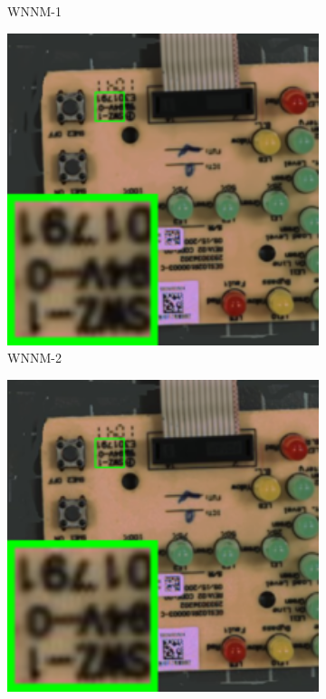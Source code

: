 \begin{figure}
\begin{subfigure}[t]{0.19\textwidth}
		\caption{WNNM-1}
    \end{subfigure}
    \hfill
    \begin{subfigure}[t]{0.19\textwidth}
        \centering
        \includegraphics[width=1\textwidth]{images/mcwnnm/nc/resize_br_WNNMJ_circuit.png}
		\caption{WNNM-2}
    \end{subfigure}
    \hfill
    \begin{subfigure}[t]{0.19\textwidth}
        \centering
        \includegraphics[width=1\textwidth]{images/mcwnnm/nc/resize_br_WNNM_ADMM_circuit.png}

\end{subfigure}
\end{figure}
